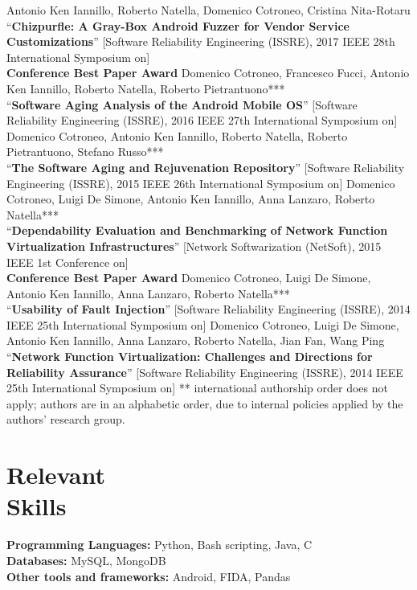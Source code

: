 \documentclass[margin,line]{resume}
\begin{document}
\begin{resume}
Antonio Ken Iannillo, Roberto Natella, Domenico Cotroneo, Cristina Nita-Rotaru\\
``\textbf{Chizpurfle: A Gray-Box Android Fuzzer for Vendor Service Customizations}''
[Software Reliability Engineering (ISSRE), 2017 IEEE 28th International Symposium on]\\\textbf{Conference Best Paper Award}
\filbreak
Domenico Cotroneo, Francesco Fucci, Antonio Ken Iannillo, Roberto Natella, Roberto Pietrantuono***\\
``\textbf{Software Aging Analysis of the Android Mobile OS}''
[Software Reliability Engineering (ISSRE), 2016 IEEE 27th International Symposium on]
\filbreak
Domenico Cotroneo, Antonio Ken Iannillo, Roberto Natella, Roberto Pietrantuono, Stefano Russo***\\
``\textbf{The Software Aging and Rejuvenation Repository}''
[Software Reliability Engineering (ISSRE), 2015 IEEE 26th International Symposium on]
\filbreak
Domenico Cotroneo, Luigi De Simone, Antonio Ken Iannillo, Anna Lanzaro, Roberto Natella***\\
``\textbf{Dependability Evaluation and Benchmarking of Network Function Virtualization Infrastructures}''
[Network Softwarization (NetSoft), 2015 IEEE 1st Conference on]\\\textbf{Conference Best Paper Award}
\filbreak
Domenico Cotroneo, Luigi De Simone, Antonio Ken Iannillo, Anna Lanzaro, Roberto Natella***\\
``\textbf{Usability of Fault Injection}''
[Software Reliability Engineering (ISSRE), 2014 IEEE 25th International Symposium on]
\filbreak
Domenico Cotroneo, Luigi De Simone, Antonio Ken Iannillo, Anna Lanzaro, Roberto Natella, Jian Fan, Wang Ping\\
``\textbf{Network Function Virtualization: Challenges and Directions for Reliability Assurance}''
[Software Reliability Engineering (ISSRE), 2014 IEEE 25th International Symposium on]
\filbreak
{\footnotesize*** international authorship order does not apply; authors are in an alphabetic order, due to internal policies applied by the authors' research group.}


\filbreak
\section{\mysidestyle Relevant\\Skills} 
\textbf{Programming Languages:} Python, Bash scripting, Java, C\vspace{2mm}\\
\textbf{Databases:} MySQL, MongoDB\vspace{2mm}\\
\textbf{Other tools and frameworks:} Android, FIDA, Pandas 



\end{resume}
\end{document}
